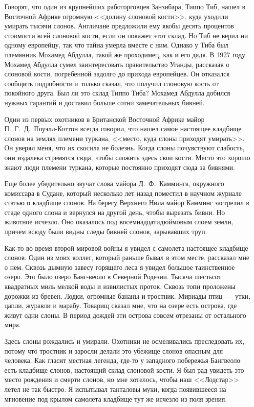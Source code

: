 \documentclass[12pt,a4paper,twoside,openany,svgnames]{memoir}
\begin{document}
Говорят, что один из крупнейших работорговцев Занзибара, Типпо Тиб, нашел в Восточной Африке огромную <<долину слоновой кости>>, куда уходили умирать тысячи слонов. Англичане предложили ему якобы десять процентов стоимости всей слоновой кости, если он покажет этот склад. Но Тиб не верил ни одному европейцу, так что тайна умерла вместе с ним. Однако у Тиба был племянник Мохамед Абдулла, такой же проходимец, как и его дядя. В 1927 году Мохамед Абдулла сумел заинтересовать правительство Уганды, рассказав о слоновой кости, погребенной задолго до прихода европейцев. Он отказался сообщить подробности и только сказал, что получил слоновую кость от покойного друга. Был ли это склад Типпо Тиба? Мохамед Абдулла добился нужных гарантий и доставил больше сотни замечательных бивней.

Один из первых охотников в Британской Восточной Африке майор П.~Г.~Д.~Поуэлл-Коттон всегда говорил, что нашел самое настоящее кладбище слонов на землях племени туркана, <<место, куда слоны приходят умирать>>. Он уверял меня, что их скосила не болезнь. Когда слоны почувствуют слабость, они издалека стремятся сюда, чтобы сложить здесь свои кости. Место это хорошо знают люди племени туркана, которые постоянно приходят сюда за бивнями.

Еще более убедительно звучат слова майора Д.~Ф.~Камминга, окружного комиссара в Судане, который несколько лет назад поместил в научном журнале статью о кладбище слонов. На берегу Верхнего Нила майор Камминг застрелил в стаде одного слона и вернулся на другой день, чтобы вырезать бивни. Но животное исчезло. Оно оказалось под восемнадцатидюймовым слоем земли, причем всюду были видны следы бивней слонов, зарывавших труп.

Как-то во время второй мировой войны я увидел с самолета настоящее кладбище слонов. Один из моих коллег, который раньше бывал в этом месте, рассказал мне о нем. Сквозь дымную завесу горящего леса я увидел большое таинственное озеро. Это было озеро Банг-веоло в Северной Родезии. Тысяча шестьсот квадратных миль мелкой воды и извилистых проток. Сквозь топи проложены дорожки из бревен. Лодки, огромные бананы и тростник. Мириады птиц~--- утки, цапли, журавли и марабу. Товарищ сказал мне, что на озере есть острова, где живут одни слоны. В период дождей эти острова совсем отрезаны от остального мира.

Здесь слоны рождались и умирали. Охотники не осмеливались преследовать их, потому что тростник и заросли делали это убежище слонов опасным для человека. Как гласит местная легенда, где-то у западного побережья Бангвеоло есть кладбище слонов, настоящий склад слоновой кости. Я был рад увидеть это место рождения и смерти слонов, но мне хотелось, чтобы наш <<Лодстар>> летел не так быстро. Я испытывал танталовы муки, когда появившееся на мгновение под крылом самолета кладбище тут же исчезло из поля зрения.
\end{document}
